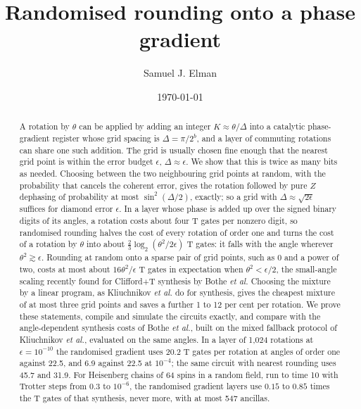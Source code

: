 \documentclass[aps,prx,twocolumn,superscriptaddress,nofootinbib,longbibliography]{revtex4-2}
\theoremstyle{remark}
\begin{document}
\title{Randomised rounding onto a phase gradient}

\author{Samuel J. Elman}

\date{\today}

\begin{abstract}
A rotation by $\theta$ can be applied by adding an integer $K\approx\theta/\Delta$ into a
catalytic phase-gradient register whose grid spacing is $\Delta=\pi/2^b$, and a layer of commuting
rotations can share one such addition. The grid is usually chosen fine enough that the nearest
grid point is within the error budget $\epsilon$, $\Delta\approx\epsilon$. We show that this is
twice as many bits as needed. Choosing between the two neighbouring grid points at random, with
the probability that cancels the coherent error, gives the rotation followed by pure $Z$
dephasing of probability at most $\sin^2(\Delta/2)$, exactly; so a grid with
$\Delta\approx\sqrt{2\epsilon}$ suffices for diamond error $\epsilon$. In a layer whose phase is
added up over the signed binary digits of its angles, a rotation costs about four T gates per
nonzero digit, so randomised rounding halves the cost of every rotation of order one and turns
the cost of a rotation by $\theta$ into about $\tfrac23\log_2(\theta^2/2\epsilon)$ T gates: it
falls with the angle wherever $\theta^2\gtrsim\epsilon$. Rounding at random onto a sparse pair of
grid points, such as $0$ and a power of two, costs at most about $16\theta^2/\epsilon$ T gates in
expectation when $\theta^2<\epsilon/2$, the small-angle scaling recently found for Clifford+T
synthesis by Bothe \textit{et al.} Choosing the mixture by a linear program, as Kliuchnikov
\textit{et al.} do for synthesis, gives the cheapest mixture of at most three grid points and
saves a further 1 to 12 per cent per rotation. We prove these statements, compile and simulate the circuits
exactly, and compare with the angle-dependent synthesis costs of Bothe \textit{et al.}, built on
the mixed fallback protocol of Kliuchnikov \textit{et al.}, evaluated on the same angles. In a
layer of 1,024 rotations at $\epsilon=10^{-10}$ the randomised gradient uses 20.2 T gates per
rotation at angles of order one against 22.5, and 6.9 against 22.5 at $10^{-4}$; the same
circuit with nearest rounding uses 45.7 and 31.9. For Heisenberg chains of 64 spins in a random
field, run to time 10 with Trotter steps from $0.3$ to $10^{-6}$, the randomised gradient layers
use $0.15$ to $0.85$ times the T gates of that synthesis, never more, with at most 547 ancillas.
\end{abstract}
\end{document}
